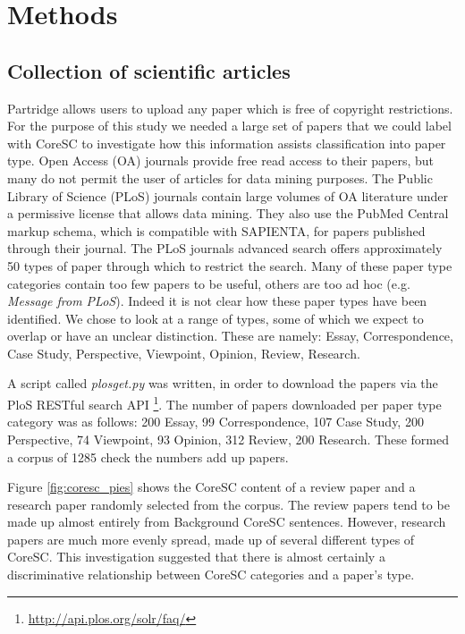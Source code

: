 \documentclass{svmult}
\begin{document}
\vspace{-15pt}
\section{Methods}
\label{sec:2}

\subsection*{Collection of scientific articles} Partridge allows users to
upload any paper which is free of copyright restrictions.  For the purpose of
this study we needed a large set of papers that we could label with CoreSC to
investigate how this information assists classification into paper type.  Open
Access (OA) journals provide free read access to their papers, but many do not
permit the user of articles for data mining purposes. The Public Library of
Science (PLoS) journals contain large volumes of OA literature under a
permissive license that allows data mining.  They also use the PubMed Central
markup schema, which is compatible with SAPIENTA, for papers published through
their journal. The PLoS journals advanced search offers approximately 50 types
of paper through which to restrict the search.  Many of these paper type
categories contain too few papers to be useful, others are too ad hoc (e.g.
{\it Message from PLoS}). Indeed it is not clear how these paper types have
been identified. We chose to look at a range of types, some of which we expect
to overlap or have an unclear distinction.  These are namely: Essay,
Correspondence, Case Study, Perspective, Viewpoint, Opinion, Review, Research. 

A script called {\em plosget.py} was written, in order to download the
papers via the PloS RESTful search API \footnote{\url{http://api.plos.org/solr/faq/}}. The number of papers downloaded per
paper type category was as follows: 200 Essay, 99 Correspondence, 107 Case
Study, 200 Perspective, 74 Viewpoint, 93 Opinion, 312 Review, 200 Research.
These formed a corpus of 1285 %
check the numbers add up papers.

Figure \ref{fig:coresc_pies} shows the CoreSC content of a review paper and a
research paper randomly selected from the corpus.  The review papers tend to be
made up almost entirely from Background CoreSC sentences.  However, research
papers are much more evenly spread, made up of several different types of
CoreSC.  This investigation suggested that there is almost certainly a
discriminative relationship between CoreSC categories and a paper's type. 
\end{document}
